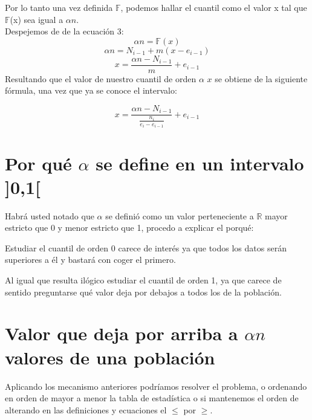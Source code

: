 \documentclass[a4paper , 11pt, spanish ]{article}
\begin{document}
Por lo tanto una vez definida $\mathbb{F}$, podemos hallar el cuantil como el valor x tal que $\mathbb{F}$(x) sea igual a $ \alpha n$. 
\\ Despejemos de de la ecuación 3: 
$$\alpha n = \mathbb{F}(x) $$
$$ \alpha n = N_{i-1} + m ( x-e_{i-1})$$
$$ x = \frac{\alpha n - N_{i-1}}{ m} + e_{i-1} $$
Resultando que el valor de nuestro cuantil de orden $\alpha$ $x$ se obtiene de la siguiente fórmula, una vez que ya se conoce el intervalo: 

\begin{equation}
x = \frac{\alpha n - N_{i-1}}{ \frac{n_{i}}{ e_{i}-e_{i-1} }} + e_{i-1}
\end{equation}


\section*{ Por qué $\alpha $ se define en un intervalo ]0,1[ }  
Habrá usted notado que $\alpha $ se definió como un valor perteneciente a $\mathbb{R}$ mayor estricto que 0 y menor estricto que 1, procedo a explicar el porqué:
\par Estudiar el cuantil de orden 0 carece de interés ya que todos los datos serán superiores a él y bastará con coger el primero.  
\par Al igual que resulta ilógico estudiar el cuantil de orden 1, ya que carece de sentido preguntarse qué valor deja por debajos a todos los de la población.

\section*{Valor que deja por arriba a $\alpha n $ valores de una población} 

Aplicando los mecanismo anteriores podríamos resolver el problema, o ordenando en orden de mayor a menor la tabla de estadística o si mantenemos el orden de alterando en las definiciones  y ecuaciones el $\leq$ por $\geq$.

\theendnotes 
\end{document}
